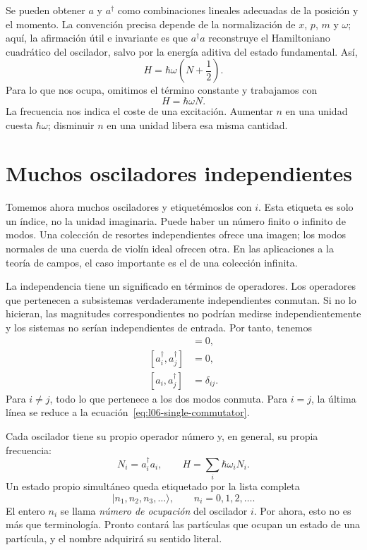 Se pueden obtener \(a\) y \(a^\dagger\) como combinaciones lineales adecuadas de la posición y el momento. La convención precisa depende de la normalización de \(x\), \(p\), \(m\) y \(\omega\); aquí, la afirmación útil e invariante es que \(a^\dagger a\) reconstruye el Hamiltoniano cuadrático del oscilador, salvo por la energía aditiva del estado fundamental. Así,
\begin{equation}
H=\hbar\omega\left(N+\frac12\right).
\end{equation}
Para lo que nos ocupa, omitimos el término constante y trabajamos con
\begin{equation}
H=\hbar\omega N.
\label{eq:l06-one-oscillator-hamiltonian}
\end{equation}
La frecuencia nos indica el coste de una excitación. Aumentar \(n\) en una unidad cuesta \(\hbar\omega\); disminuir \(n\) en una unidad libera esa misma cantidad.

\section{Muchos osciladores independientes}

Tomemos ahora muchos osciladores y etiquetémoslos con \(i\). Esta etiqueta es solo un índice, no la unidad imaginaria. Puede haber un número finito o infinito de modos. Una colección de resortes independientes ofrece una imagen; los modos normales de una cuerda de violín ideal ofrecen otra. En las aplicaciones a la teoría de campos, el caso importante es el de una colección infinita.

La independencia tiene un significado en términos de operadores. Los operadores que pertenecen a subsistemas verdaderamente independientes conmutan. Si no lo hicieran, las magnitudes correspondientes no podrían medirse independientemente y los sistemas no serían independientes de entrada. Por tanto, tenemos
\begin{align}
[a_i,a_j]&=0, \\
[a_i^\dagger,a_j^\dagger]&=0, \\
[a_i,a_j^\dagger]&=\delta_{ij}.
\label{eq:l06-many-commutators}
\end{align}
Para \(i\ne j\), todo lo que pertenece a los dos modos conmuta. Para \(i=j\), la última línea se reduce a la ecuación~\eqref{eq:l06-single-commutator}.

Cada oscilador tiene su propio operador número y, en general, su propia frecuencia:
\begin{equation}
N_i=a_i^\dagger a_i,
\qquad
H=\sum_i\hbar\omega_i N_i.
\label{eq:l06-many-hamiltonian}
\end{equation}
Un estado propio simultáneo queda etiquetado por la lista completa
\begin{equation}
|n_1,n_2,n_3,\ldots\rangle,
\qquad n_i=0,1,2,\ldots.
\label{eq:l06-occupation-ket}
\end{equation}
El entero \(n_i\) se llama \emph{número de ocupación} del oscilador \(i\). Por ahora, esto no es más que terminología. Pronto contará las partículas que ocupan un estado de una partícula, y el nombre adquirirá su sentido literal.

